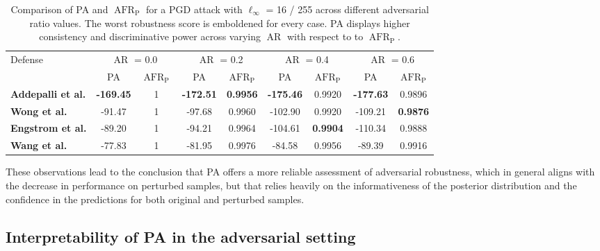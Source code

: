 \begin{table}[h]
    \centering
    \begin{tabular}{l|cc|cc|cc|cc}
    \multirow{2}{*}{Defense} & \multicolumn{2}{c|}{$\operatorname{AR}$ = 0.0} & \multicolumn{2}{c|}{$\operatorname{AR}$ = 0.2} & \multicolumn{2}{c|}{$\operatorname{AR}$ = 0.4} & \multicolumn{2}{c}{$\operatorname{AR}$ = 0.6} \\
    & PA & $\operatorname{AFR}_{\text{P}}$ & PA & $\operatorname{AFR}_{\text{P}}$ & PA & $\operatorname{AFR}_{\text{P}}$ & PA & $\operatorname{AFR}_{\text{P}}$ \\
    \midrule
    {\color{tab:purple} \textbf{Addepalli et al.}} & \textbf{-169.45} & 1 & \textbf{-172.51} & \textbf{0.9956} & \textbf{-175.46} & 0.9920 & \textbf{-177.63} & 0.9896 \\
    {\color{tab:red} \textbf{Wong et al.}} & -91.47 & 1 & -97.68 & 0.9960 & -102.90 & 0.9920 & -109.21 & \textbf{0.9876} \\
    {\color{tab:blue} \textbf{Engstrom et al.}} & -89.20 & 1 & -94.21 & 0.9964 & -104.61 & \textbf{0.9904} & -110.34 & 0.9888 \\
    {\color{tab:brown} \textbf{Wang et al.}} & -77.83 & 1 & -81.95 & 0.9976 & -84.58 & 0.9956 & -89.39 & 0.9916 \\
    \bottomrule
    \end{tabular}
    \caption{
        Comparison of PA and $\operatorname{AFR}_{\text{P}}$ for a 
        PGD attack with $\ell_\infty$ = 16 / 255 across different adversarial 
        ratio values. The worst robustness score is emboldened for every case.
        PA displays higher consistency and discriminative power 
        across varying $\operatorname{AR}$ with respect to to 
        $\operatorname{AFR}_{\text{P}}$.
    }
    \label{tab:pa_afrpred_comparison_table}
\end{table}


These observations lead to the conclusion that PA offers a more reliable
assessment of adversarial robustness, which in general aligns with the decrease
in performance on perturbed samples, but that relies heavily on the informativeness
of the posterior distribution and the confidence in the predictions for both
original and perturbed samples. \\

\subsection{Interpretability of PA in the adversarial setting}

